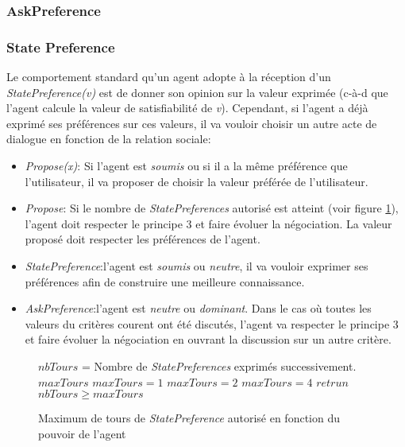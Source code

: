 		\subsubsection{AskPreference}
	
	
		\subsubsection{State Preference}
			Le comportement standard qu'un agent adopte à la réception d'un \emph{StatePreference(v)} est de donner son opinion sur la valeur exprimée (c-à-d que l'agent calcule la valeur de satisfiabilité de \textit{v}). Cependant, si l'agent a déjà exprimé ses préférences sur ces valeurs, il va vouloir choisir un autre acte de dialogue en fonction de la relation sociale:
			\begin{itemize}
				\item \emph{Propose(x)}: Si l'agent est \emph{soumis} ou si il a la même préférence que l'utilisateur, il va proposer de choisir la valeur préférée de l'utilisateur.
				\item \emph{Propose}: Si le nombre de \emph{StatePreferences} autorisé est atteint (voir figure \ref{alg:maxtours}), l'agent doit respecter le principe 3 et faire évoluer la négociation. La valeur proposé doit respecter les préférences de l'agent. 
				\item \emph{StatePreference}:l'agent est \emph{soumis} ou \emph{neutre}, il va vouloir exprimer ses préférences afin de construire une meilleure connaissance.
				\item \emph{AskPreference}:l'agent est \emph{neutre} ou \emph{dominant}. Dans le cas où toutes les valeurs du critères courent ont été discutés, l'agent va respecter le principe 3 et faire évoluer la négociation en ouvrant la discussion sur un autre critère.
			\end{itemize}
			
			\begin{figure}[]
				\begin{algorithmic}[1]\small
					\State $nbTours$ = Nombre de \emph{StatePreferences} exprimés successivement.
					\State $maxTours$ 
					\State $maxTours = 1$
					\EndIf
					 \State $maxTours = 2$
					\EndIf
					\State $maxTours = 4$
					\EndIf
					\State $retrun$ $nbTours\geq maxTours$
					\EndFunction
				\end{algorithmic}
				\vskip 8pt
				\label{alg:maxtours}
				\caption{Maximum de tours de \emph{StatePreference} autorisé en fonction du pouvoir de l'agent}
			\end{figure} 
